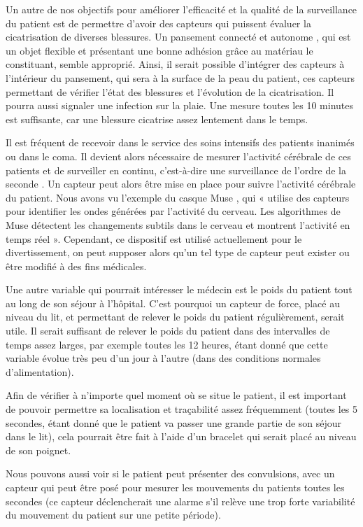 \documentclass{article}
\begin{document}
Un autre de nos objectifs pour améliorer l’efficacité et la qualité de la surveillance du patient est de permettre d’avoir des capteurs qui puissent évaluer la cicatrisation de diverses blessures. Un pansement connecté et autonome \cite{Pansement}, qui est un objet flexible et présentant une bonne adhésion grâce au matériau le constituant, semble approprié. Ainsi, il serait possible d’intégrer des capteurs à l’intérieur du pansement, qui sera à la surface de la peau du patient, ces capteurs permettant de vérifier l’état des blessures et l’évolution de la cicatrisation. Il pourra aussi signaler une infection sur la plaie. Une mesure toutes les 10 minutes est suffisante, car une blessure cicatrise assez lentement dans le temps.

Il est fréquent de recevoir dans le service des soins intensifs des patients inanimés ou dans le coma. Il devient alors nécessaire de mesurer l’activité cérébrale de ces patients et de surveiller en continu, c’est-à-dire une surveillance de l'ordre de la seconde . Un capteur peut alors être mise en place pour suivre l’activité cérébrale du patient. Nous avons vu l’exemple du casque Muse \cite{Muse}, qui « utilise des capteurs pour identifier les ondes générées par l’activité du cerveau. Les algorithmes de Muse détectent les changements subtils dans le cerveau et montrent l’activité en temps réel ». Cependant, ce dispositif est utilisé actuellement pour le divertissement, on peut supposer alors qu’un tel type de capteur peut exister ou être modifié à des fins médicales.

Une autre variable qui pourrait intéresser le médecin est le poids du patient tout au long de son séjour à l’hôpital. C’est pourquoi un capteur de force, placé au niveau du lit, et permettant de relever le poids du patient régulièrement, serait utile. Il serait suffisant de relever le poids du patient dans des intervalles de temps assez larges, par exemple toutes les 12 heures, étant donné que cette variable évolue très peu d’un jour à l'autre (dans des conditions normales d'alimentation).

Afin de vérifier à n’importe quel moment où se situe le patient, il est important de pouvoir permettre sa localisation et traçabilité \cite{Localisation} assez fréquemment (toutes les 5 secondes, étant donné que le patient va passer une grande partie de son séjour dans le lit), cela pourrait être fait à l’aide d’un bracelet qui serait placé au niveau de son poignet. 

Nous pouvons aussi voir si le patient peut présenter des convulsions, avec un capteur \cite{Convulsion} qui peut être posé pour mesurer les mouvements du patients toutes les secondes (ce capteur déclencherait une alarme s’il relève une trop forte variabilité du mouvement du patient sur une petite période). 
\end{document}
